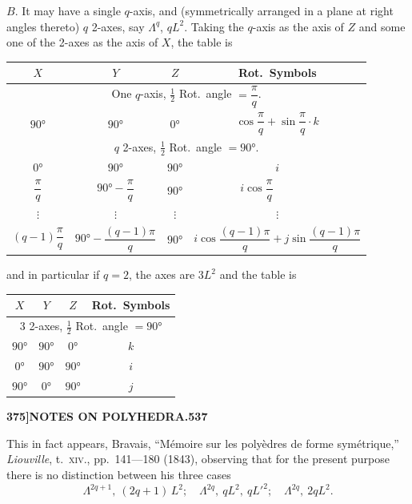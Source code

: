 \documentclass[11pt,a4paper]{article}
\begin{document}
$B$. It may have a single $q$-axis, and (symmetrically arranged in a plane at right angles thereto) $q$ 2-axes, say $\Lambda^{q}$, $qL^{2}$. Taking the $q$-axis as the axis of $Z$ and some one of the 2-axes as the axis of $X$, the table is
\begin{center}
\begin{tabular}{|c|c|c|c|}
\hline
$X$ & $Y$ & $Z$ & Rot.~Symbols \\
\hline
\multicolumn{4}{c}{One $q$-axis, $\tfrac{1}{2}$ Rot.~angle $= \dfrac{\pi}{q}$.} \\
\hline
$90°$ & $90°$ & $0°$ & $\cos\dfrac{\pi}{q} + \sin\dfrac{\pi}{q}\cdot k$ \\
\hline
\multicolumn{4}{c}{$q$ 2-axes, $\tfrac{1}{2}$ Rot.~angle $= 90°$.} \\
\hline
$0°$ & $90°$ & $90°$ & $i$ \\
$\dfrac{\pi}{q}$ & $90° - \dfrac{\pi}{q}$ & $90°$ & $i\cos\dfrac{\pi}{q}\phantom{+j\sin\dfrac{\pi}{q}}$ \\
$\vdots$ & $\vdots$ & $\vdots$ & $\vdots$ \\
$(q-1)\dfrac{\pi}{q}$ & $90° - \dfrac{(q-1)\pi}{q}$ & $90°$ & $i\cos\dfrac{(q-1)\pi}{q} + j\sin\dfrac{(q-1)\pi}{q}$ \\
\hline
\end{tabular}
\end{center}
and in particular if $q = 2$, the axes are $3L^{2}$ and the table is
\begin{center}
\begin{tabular}{|c|c|c|c|}
\hline
$X$ & $Y$ & $Z$ & Rot.~Symbols \\
\hline
\multicolumn{4}{c}{3 2-axes, $\tfrac{1}{2}$ Rot.~angle $= 90°$} \\
\hline
$90°$ & $90°$ & $0°$ & $k$ \\
\hline
$0°$ & $90°$ & $90°$ & $i$ \\
\hline
$90°$ & $0°$ & $90°$ & $j$ \\
\hline
\end{tabular}
\end{center}

\newpage
\begin{flushright}
\textbf{375]\hspace{1em}NOTES ON POLYHEDRA.\hfill537}
\end{flushright}

\vspace{12pt}

\noindent
This in fact appears, Bravais, ``M\'{e}moire sur les poly\`{e}dres de forme sym\'{e}trique,'' \textit{Liouville}, t.~\textsc{xiv}., pp.~141---180 (1843), observing that for the present purpose there is no distinction between his three cases
\[
\Lambda^{2q+1},\ (2q+1)\,L^{2};\quad \Lambda^{2q},\ qL^{2},\ qL'^{2};\quad \Lambda^{2q},\ 2qL^{2}.
\]
\end{document}
